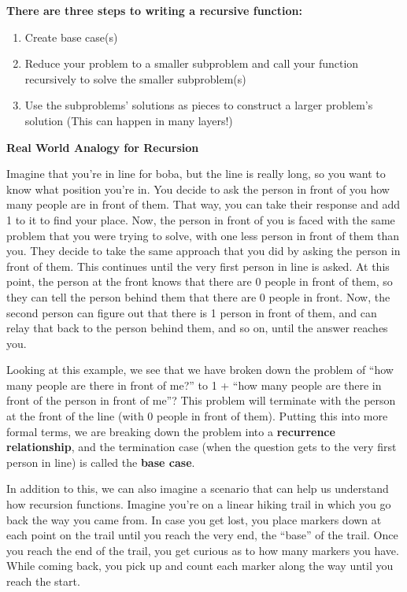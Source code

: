\begin{blocksection}
\textbf{There are three steps to writing a recursive function:}
\begin{enumerate}
    \item Create base case(s)
    \item Reduce your problem to a smaller subproblem and call your function recursively to solve the smaller subproblem(s)
    \item Use the subproblems' solutions as pieces to construct a larger problem's solution (This can happen in many layers!)
\end{enumerate}

\vspace{3mm}

\textbf{Real World Analogy for Recursion}


Imagine that you're in line for boba, but the line is really long, so you want to know what position you're in. You decide to ask the person in front of you how many people are in front of them. That way, you can take their response and add 1 to it to find your place. Now, the person in front of you is faced with the same problem that you were trying to solve, with one less person in front of them than you. They decide to take the same approach that you did by asking the person in front of them. This continues until the very first person in line is asked. At this point, the person at the front knows that there are 0 people in front of them, so they can tell the person behind them that there are 0 people in front. Now, the second person can figure out that there is 1 person in front of them, and can relay that back to the person behind them, and so on, until the answer reaches you.

Looking at this example, we see that we have broken down the problem of ``how many people are there in front of me?'' to 1 + ``how many people are there in front of the person in front of me''? This problem will terminate with the person at the front of the line (with 0 people in front of them). Putting this into more formal terms, we are breaking down the problem into a \textbf{recurrence relationship}, and the termination case (when the question gets to the very first person in line) is called the \textbf{base case}.

\pagebreak

In addition to this, we can also imagine a scenario that can help us understand how recursion functions. Imagine you're on a linear hiking trail in which you go back the way you came from. In case you get lost, you place markers down at each point on the trail until you reach the very end, the ``base'' of the trail. Once you reach the end of the trail, you get curious as to how many markers you have. While coming back, you pick up and count each marker along the way until you reach the start.


\end{blocksection}
